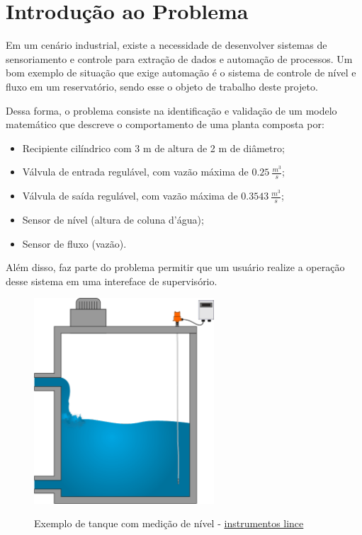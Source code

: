 \documentclass[
	article,			%
	11pt,				%
	oneside,			%
	a4paper,			%
	section=TITLE,		%
	english,			%
	brazil,				%
	sumario=tradicional
	]{abntex2}
\begin{document}
\newpage

\section{Introdução ao Problema}
\label{ssec:intro}

Em um cenário industrial, existe a necessidade de desenvolver sistemas de sensoriamento e controle para extração de dados e automação de processos. Um bom exemplo de situação que exige automação é o sistema de controle de nível e fluxo em um reservatório, sendo esse o objeto de trabalho deste projeto.

Dessa forma, o problema consiste na identificação e validação de um modelo matemático que descreve o comportamento de uma planta composta por:
\begin{itemize}
\item Recipiente cilíndrico com 3 m de altura de 2 m de diâmetro;
\item Válvula de entrada regulável, com vazão máxima de $0.25~\frac{m^3}{s}$;
\item Válvula de saída regulável, com vazão máxima de $0.3543~\frac{m^3}{s}$;
\item Sensor de nível (altura de coluna d'água);
\item Sensor de fluxo (vazão).
\end{itemize}
Além disso, faz parte do problema permitir que um usuário realize a operação desse sistema em uma intereface de supervisório.
\begin{figure}[H]
    \centering
    \caption{Exemplo de tanque com medição de nível -  \href{https://instrumentos-lince.com.br/aplicacao/tanque-de-vacuo-para-o-sistema-de-esgoto/}{instrumentos lince}} \includegraphics[width=0.6\textwidth]{img/tanque-de-vacuo-para-o-sistema-de-esgoto.png}
    \label{fig:tank}
\end{figure}
\end{document}
